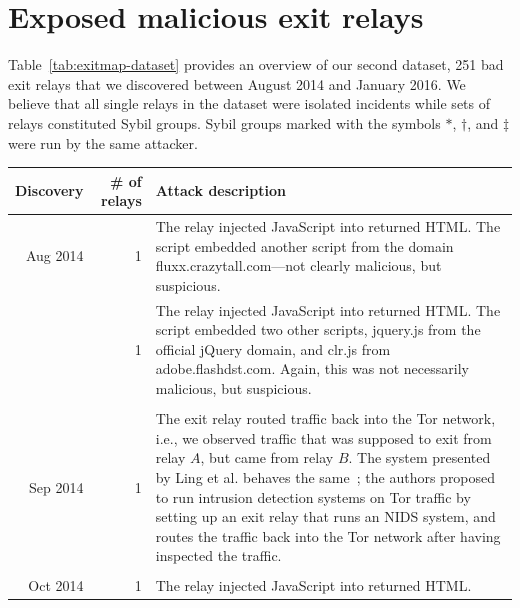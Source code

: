 \appendix

\section{Exposed malicious exit relays}
\label{sec:malicious-relays}
Table~\ref{tab:exitmap-dataset} provides an overview of our second dataset, 251
bad exit relays that we discovered between August 2014 and January 2016.  We
believe that all single relays in the dataset were isolated incidents while sets
of relays constituted Sybil groups.  Sybil groups marked with the symbols
$*$, $\dagger$, and $\ddagger$ were run by the same attacker.

\begin{table}
\small
\centering
\begin{tabularx}{\textwidth}{r r X}
\toprule
\textbf{Discovery} & \textbf{\# of relays} & \textbf{Attack description} \\
\midrule
Aug 2014 & 1 & The relay injected JavaScript into returned HTML.  The script
embedded another script from the domain fluxx.crazytall.com---not clearly
malicious, but suspicious. \\

& 1 & The relay injected JavaScript into returned HTML.  The script
embedded two other scripts, jquery.js from the official jQuery domain, and
clr.js from adobe.flashdst.com.  Again, this was not necessarily malicious, but
suspicious. \\

& & \\

Sep 2014 & 1 & The exit relay routed traffic back into the Tor network, i.e., we
observed traffic that was supposed to exit from relay $A$, but came from relay
$B$.  The system presented by Ling et al. behaves the same~\cite{Ling2015a};
the authors proposed to run intrusion detection systems on Tor traffic by
setting up an exit relay that runs an NIDS system, and routes the traffic back
into the Tor network after having inspected the traffic. \\

& & \\

Oct 2014 & 1 & The relay injected JavaScript into returned HTML. \\


\end{tabularx}
\end{table}
